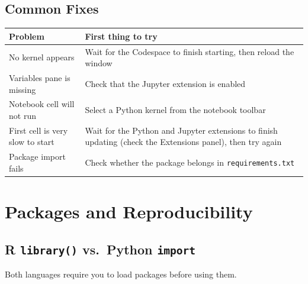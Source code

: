 \documentclass[
  letterpaper,
  DIV=11,
  numbers=noendperiod,
  oneside]{scrreprt}
\begin{document}
\section{Common Fixes}\label{common-fixes}

\begin{longtable}[]{@{}
  >{\raggedright\arraybackslash}p{}
  >{\raggedright\arraybackslash}p{}@{}}
\toprule\noalign{}
\begin{minipage}[b]{\linewidth}\raggedright
Problem
\end{minipage} & \begin{minipage}[b]{\linewidth}\raggedright
First thing to try
\end{minipage} \\
\midrule\noalign{}
\endhead
\bottomrule\noalign{}
\endlastfoot
No kernel appears & Wait for the Codespace to finish starting, then
reload the window \\
Variables pane is missing & Check that the Jupyter extension is
enabled \\
Notebook cell will not run & Select a Python kernel from the notebook
toolbar \\
First cell is very slow to start & Wait for the Python and Jupyter
extensions to finish updating (check the Extensions panel), then try
again \\
Package import fails & Check whether the package belongs in
\texttt{requirements.txt} \\
\end{longtable}

\chapter{Packages and
Reproducibility}\label{packages-and-reproducibility}

\section{\texorpdfstring{R \texttt{library()} vs.~Python
\texttt{import}}{R library() vs.~Python import}}\label{r-library-vs.-python-import}

Both languages require you to load packages before using them.
\end{document}
